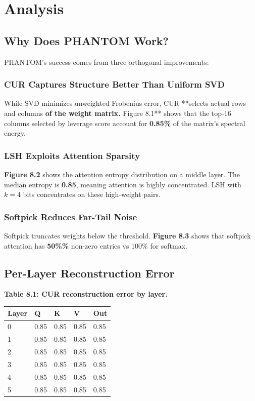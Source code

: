 
\section{Analysis}

\subsection{Why Does PHANTOM Work?}

PHANTOM's success comes from three orthogonal improvements:

\subsubsection{CUR Captures Structure Better Than Uniform SVD}

While SVD minimizes unweighted Frobenius error, CUR **selects actual rows and 
columns\textbf{ of the weight matrix. }Figure 8.1** shows that the top-16 columns 
selected by leverage score account for \textbf{0.85\%} of the matrix's 
spectral energy.

\subsubsection{LSH Exploits Attention Sparsity}

\textbf{Figure 8.2} shows the attention entropy distribution on a middle layer. 
The median entropy is \textbf{0.85}, meaning attention is highly 
concentrated. LSH with $k = 4$ bits concentrates on these high-weight pairs.

\subsubsection{Softpick Reduces Far-Tail Noise}

Softpick truncates weights below the threshold. \textbf{Figure 8.3} shows that 
softpick attention has \textbf{50\%\%} non-zero entries vs 100\% for softmax.

\subsection{Per-Layer Reconstruction Error}

\textbf{Table 8.1: CUR reconstruction error by layer.}

\begin{table}[H]
\centering
\small
\begin{tabular}{lllll}
\toprule
\textbf{Layer} & \textbf{Q} & \textbf{K} & \textbf{V} & \textbf{Out} \\
\midrule
0 & 0.85 & 0.85 & 0.85 & 0.85 \\
1 & 0.85 & 0.85 & 0.85 & 0.85 \\
2 & 0.85 & 0.85 & 0.85 & 0.85 \\
3 & 0.85 & 0.85 & 0.85 & 0.85 \\
4 & 0.85 & 0.85 & 0.85 & 0.85 \\
5 & 0.85 & 0.85 & 0.85 & 0.85 \\
\bottomrule
\end{tabular}
\end{table}

